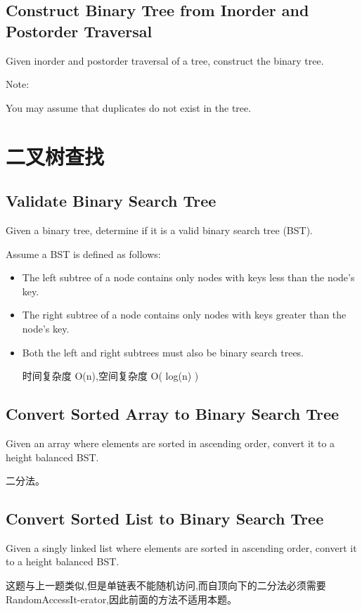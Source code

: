 \documentclass[12pt]{book}
\begin{document}
\subsection{Construct Binary Tree from Inorder and Postorder Traversal}
\label{sec-4-3-2}
Given inorder and postorder traversal of a tree, construct the binary tree.

Note:

You may assume that duplicates do not exist in the tree.

\section{二叉树查找}
\label{sec-4-4}

\subsection{Validate Binary Search Tree}
\label{sec-4-4-1}
Given a binary tree, determine if it is a valid binary search tree (BST).

Assume a BST is defined as follows:
\begin{itemize}
\item The left subtree of a node contains only nodes with keys less than the node's key.
\item The right subtree of a node contains only nodes with keys greater than the node's key.
\item Both the left and right subtrees must also be binary search trees.

时间复杂度 O(n),空间复杂度 O( log(n) )
\end{itemize}

\subsection{Convert Sorted Array to Binary Search Tree}
\label{sec-4-4-2}
Given an array where elements are sorted in ascending order, convert it to a height balanced BST.

二分法。
\subsection{Convert Sorted List to Binary Search Tree}
\label{sec-4-4-3}
Given a singly linked list where elements are sorted in ascending order, convert it to a height balanced BST.

这题与上一题类似,但是单链表不能随机访问,而自顶向下的二分法必须需要 RandomAccessIt-erator,因此前面的方法不适用本题。
\end{document}
